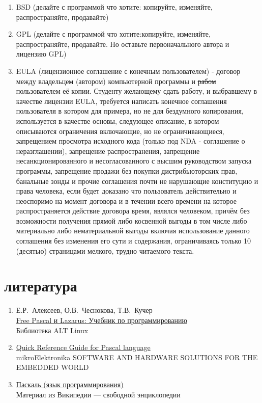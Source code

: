 \documentclass[unicode, 12pt, a4paper,oneside,fleqn]{article}
\begin{document}
\begin{enumerate}
\begin{enumerate}
\item BSD (делайте с программой что хотите: копируйте,
    изменяйте, распространяйте, продавайте)
\item GPL (делайте с программой что хотите:копируйте,
    изменяйте, распространяйте, продавайте. Но оставьте
    первоначального автора и лицензию GPL)
\item EULA (лицензионное соглашение с конечным пользователем) -
  договор между владельцем (автором) компьютерной программы и
 \sout{рабом} пользователем её копии. 
  {\tiny Студенту желающему сдать работу, и выбравшему в качестве
    лицензии EULA, требуется написать конечное соглашения пользователя
    в котором для примера, но не для бездумного копирования,
    используется в качестве основы, следующее описание, в котором
    описываются ограничения включающие, но не ограничивающиеся,
    запрещением просмотра исходного кода (только под NDA - соглашение
    о неразглашении), запрещение распространения, запрещение
    несанкционированного и несогласованного с высшим руководством
    запуска программы, запрещение продажи без покупки дистрибьюторских
    прав, банальные зонды и прочие соглашения почти не нарушающие
    конституцию и права человека, если будет доказано что пользователь
    действительно и неоспоримо на момент договора и в течении всего времени на
    которое распространяется действие договора время, являлся
    человеком, причём без возможности получения прямой либо косвенной выгоды
    в том числе либо материально либо нематериальной выгоды включая
    использование данного соглашения без изменения его сути и содержания,
    ограничиваясь только 10 (десятью) страницами мелкого, трудно
    читаемого текста.}
\end{enumerate}




{\tiny }
\end{enumerate}


\section{литература}


\begin{enumerate}
\item
  Е.Р.~Алексеев, О.В.~Чеснокова, Т.В.~Кучер\\
  \href{http://www.altlinux.org/Books:FreePascal}{Free Pascal и Lazarus: Учебник по программированию} \\
  Библиотека ALT Linux
  
\item
  \href{http://www.elettroshop.com/files/prodotti/download/mikroelektronica/pascal_syntax.pdf}{Quick Reference Guide for Pascal language} \\
  mikroElektronika SOFTWARE AND HARDWARE SOLUTIONS FOR THE EMBEDDED WORLD
  
\item
  \href{http://ru.wikipedia.org/wiki/Pascal}{Паскаль (язык программирования)} \\
  Материал из Википедии — свободной энциклопедии 
\end{enumerate}
\end{document}
